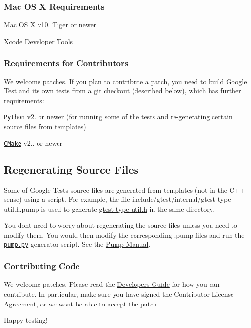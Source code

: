 \subsubsection*{Mac OS X Requirements}


\begin{DoxyItemize}
\item Mac OS X v10. Tiger or newer
\item Xcode Developer Tools
\end{DoxyItemize}

\subsubsection*{Requirements for Contributors}

We welcome patches. If you plan to contribute a patch, you need to build Google Test and its own tests from a git checkout (described below), which has further requirements\+:


\begin{DoxyItemize}
\item \href{https://www.python.org/}{\tt Python} v2. or newer (for running some of the tests and re-\/generating certain source files from templates)
\item \href{https://cmake.org/}{\tt C\+Make} v2.. or newer
\end{DoxyItemize}

\subsection*{Regenerating Source Files}

Some of Google Test\textquotesingle{}s source files are generated from templates (not in the C++ sense) using a script. For example, the file include/gtest/internal/gtest-\/type-\/util.\+h.\+pump is used to generate \hyperlink{gtest-type-util_8h}{gtest-\/type-\/util.\+h} in the same directory.

You don\textquotesingle{}t need to worry about regenerating the source files unless you need to modify them. You would then modify the corresponding {\ttfamily .pump} files and run the \textquotesingle{}\href{googletest/scripts/pump.py}{\tt pump.\+py}\textquotesingle{} generator script. See the \hyperlink{_pump_manual_8md}{Pump Manual}.

\subsubsection*{Contributing Code}

We welcome patches. Please read the \hyperlink{googletest_2docs_2_dev_guide_8md}{Developer\textquotesingle{}s Guide} for how you can contribute. In particular, make sure you have signed the Contributor License Agreement, or we won\textquotesingle{}t be able to accept the patch.

Happy testing! 